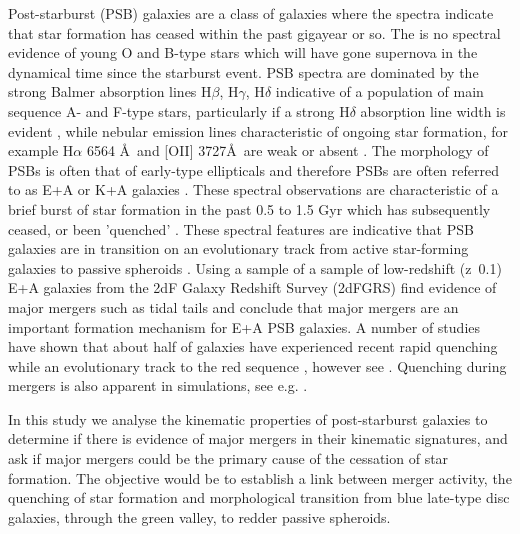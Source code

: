 Post-starburst (PSB) galaxies are a class of galaxies where the spectra indicate that star formation has ceased within the past gigayear or so. The is no spectral evidence of young O and B-type stars which will have gone supernova in the dynamical time since the starburst event. PSB spectra are dominated by the strong Balmer absorption lines H$\beta$, H$\gamma$, H$\delta$ indicative of a population of main sequence A- and F-type stars, particularly if a strong  H$\delta$ absorption line width is evident \citep{1997A&A...325.1025P}, while nebular emission lines characteristic of ongoing star formation, for example H$\alpha$ 6564 \AA\ and [OII] 3727\AA\, are weak or absent \citep{2001ApJ...547L..17B,2003PASJ...55..771G,2004MNRAS.355..713B,2005MNRAS.357..937G,2018MNRAS.477.1708P}. The morphology of PSBs is often that of early-type ellipticals and therefore PSBs are often referred to as E+A or K+A galaxies \citep{1983ApJ...270....7D,1996ApJ...466..104Z,2009ARA&A..47..159B}. These spectral observations are characteristic of a brief burst of star formation in the past 0.5 to 1.5 Gyr which has subsequently ceased, or been 'quenched' \citep{1983ApJ...270....7D,1987MNRAS.229..423C,1997A&A...325.1025P}. These spectral features are indicative that PSB galaxies are in transition on an evolutionary track from active star-forming galaxies to passive spheroids \citep{2004MNRAS.355..713B,2012MNRAS.420..672S,2013MNRAS.429.2212M}. Using a sample of a sample of low-redshift (z~0.1) E+A galaxies from the 2dF Galaxy Redshift Survey (2dFGRS) \citet{2004MNRAS.355..713B} find evidence of major mergers such as tidal tails and conclude that major mergers are an important formation mechanism for E+A PSB galaxies. A number of studies have shown that about half of galaxies have experienced recent rapid quenching while an evolutionary track to the red sequence \citep{Martin_2007,10.1111/j.1365-2966.2009.14537.x,2015MNRAS.450..435S}, however see \cite{2017ApJ...845..145W}. Quenching during mergers is also apparent in simulations, see e.g. \cite{2019MNRAS.484.2447D}.

In this study we analyse the kinematic properties of post-starburst galaxies to determine if there is evidence of major mergers in their kinematic signatures, and ask if major mergers could be the primary cause of the cessation of star formation. The objective would be to establish a link between merger activity, the quenching of star formation and morphological transition from blue late-type disc galaxies, through the green valley, to redder passive spheroids.


